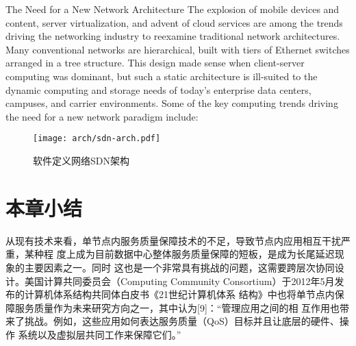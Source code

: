 The Need for a New Network Architecture %
The explosion of mobile devices and content, server virtualization, and
advent of cloud services are among the trends driving the networking
industry to reexamine traditional network architectures. Many conventional
networks are hierarchical, built with tiers of Ethernet switches arranged in
a tree structure. This design made sense when client-server computing
was dominant, but such a static architecture is ill-suited to the dynamic
computing and storage needs of today’s enterprise data centers,
campuses, and carrier environments. Some of the key computing trends
driving the need for a new network paradigm include:

\begin{figure}[tbh]
  \centering
  \texttt{[image: arch/sdn-arch.pdf]}
  \caption{软件定义网络SDN架构}
  \label{fig:pard-arch-outline}
\end{figure}


\section{本章小结}

从现有技术来看，单节点内服务质量保障技术的不足，导致节点内应用相互干扰严重，某种程
度上成为目前数据中心整体服务质量保障的短板，是成为长尾延迟现象的主要因素之一。同时
这也是一个非常具有挑战的问题，这需要跨层次协同设计。美国计算共同委员会（Computing 
Community Consortium）于2012年5月发布的计算机体系结构共同体白皮书《21世纪计算机体系
结构》中也将单节点内保障服务质量作为未来研究方向之一，其中认为[9]：``管理应用之间的相
互作用也带来了挑战。例如，这些应用如何表达服务质量（QoS）目标并且让底层的硬件、操作
系统以及虚拟层共同工作来保障它们。''

\iffalse



